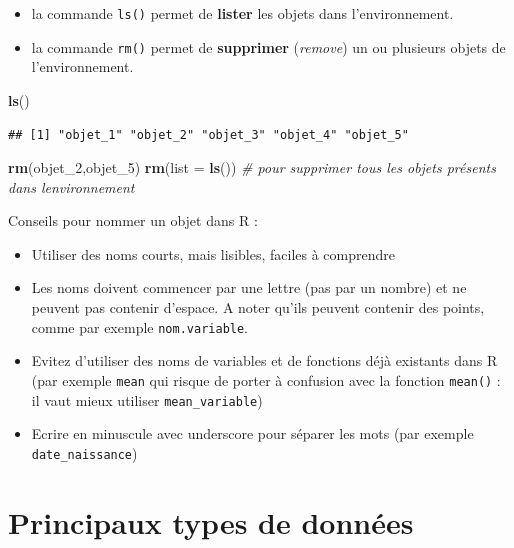 \documentclass[
]{book}
\newenvironment{Shaded}{\begin{snugshade}}{\end{snugshade}}
\newcommand{\AttributeTok}[1]{\textcolor[rgb]{0.13,0.29,0.53}{#1}}
\newcommand{\CommentTok}[1]{\textcolor[rgb]{0.56,0.35,0.01}{\textit{#1}}}
\newcommand{\FunctionTok}[1]{\textcolor[rgb]{0.13,0.29,0.53}{\textbf{#1}}}
\newcommand{\NormalTok}[1]{#1}
\providecommand{\tightlist}{%
  \setlength{\itemsep}{0pt}\setlength{\parskip}{0pt}}
\begin{document}
\begin{itemize}
\tightlist
\item
  la commande \texttt{ls()} permet de \textbf{lister} les objets dans l'environnement.
\item
  la commande \texttt{rm()} permet de \textbf{supprimer} (\emph{remove}) un ou plusieurs objets de l'environnement.
\end{itemize}

\begin{Shaded}
\begin{Highlighting}[]
\FunctionTok{ls}\NormalTok{()}
\end{Highlighting}
\end{Shaded}

\begin{verbatim}
## [1] "objet_1" "objet_2" "objet_3" "objet_4" "objet_5"
\end{verbatim}

\begin{Shaded}
\begin{Highlighting}[]
\FunctionTok{rm}\NormalTok{(objet\_2,objet\_5)}
\FunctionTok{rm}\NormalTok{(}\AttributeTok{list =} \FunctionTok{ls}\NormalTok{()) }\CommentTok{\# pour supprimer tous les objets présents dans l\textquotesingle{}environnement}
\end{Highlighting}
\end{Shaded}

Conseils pour nommer un objet dans R :

\begin{itemize}
\tightlist
\item
  Utiliser des noms courts, mais lisibles, faciles à comprendre
\item
  Les noms doivent commencer par une lettre (pas par un nombre) et ne peuvent pas contenir d'espace. A noter qu'ils peuvent contenir des points, comme par exemple \texttt{nom.variable}.
\item
  Evitez d'utiliser des noms de variables et de fonctions déjà existants dans R (par exemple \texttt{mean} qui risque de porter à confusion avec la fonction \texttt{mean()} : il vaut mieux utiliser \texttt{mean\_variable})
\item
  Ecrire en minuscule avec underscore pour séparer les mots (par exemple \texttt{date\_naissance})
\end{itemize}

\section{Principaux types de données}\label{principaux-types-de-donnuxe9es}
\end{document}
